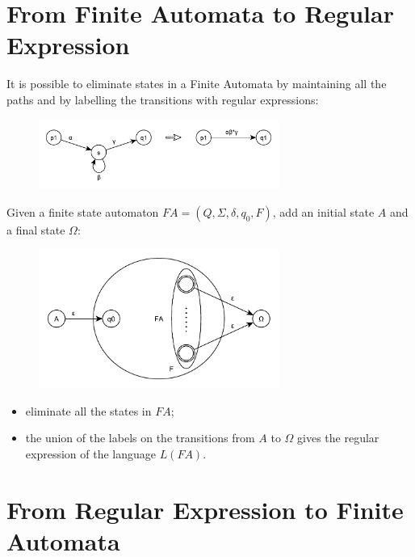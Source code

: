 \section{From Finite Automata to Regular Expression}
It is possible to eliminate states in a Finite Automata by maintaining all the paths and by labelling the transitions with regular expressions:
\begin{figure}[H]
    \centerline{\includegraphics[width=0.7\textwidth]{img/2.pdf}}
\end{figure}
Given a finite state automaton $FA = (Q, \Sigma, \delta, q_0, F)$, add an initial state $A$ and a final state $\Omega$:
\begin{figure}[H]
    \centerline{\includegraphics[width=0.7\textwidth]{img/3.pdf}}
\end{figure}
\begin{itemize}
    \item eliminate all the states in $FA$;
    \item the union of the labels on the transitions from $A$ to $\Omega$ gives the regular expression of the language $L(FA)$.
\end{itemize}

\section{From Regular Expression to Finite Automata}

